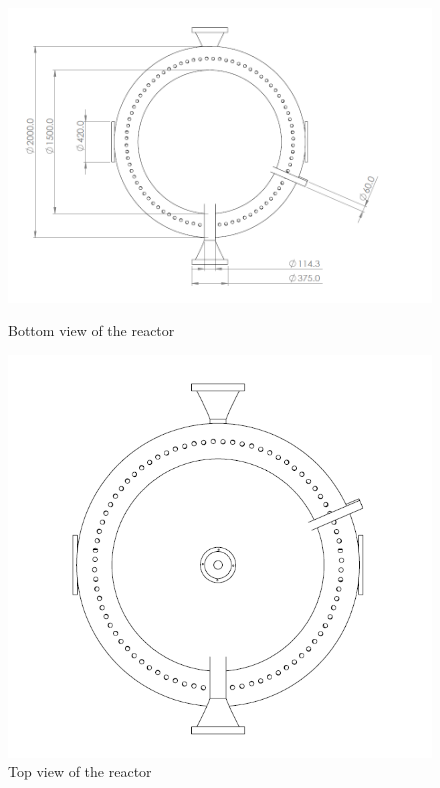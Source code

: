 \begin{figure}[h]
    \begin{minipage}[t]{0.49\linewidth}
        \includegraphics[width=\linewidth]{chapters/2-reaction/figures/FYD reactor bottom view with calc.PNG}
        \caption{Bottom view of the reactor}
        \label{fig:reactorbottom}
    \end{minipage}\hfill
    \begin{minipage}[t]{0.4\linewidth}
        \includegraphics[width=\linewidth]{chapters/2-reaction/figures/FYD reactor top view.PNG}
        \caption{Top view of the reactor}
        \label{fig:reactortop}
    \end{minipage}
\end{figure}